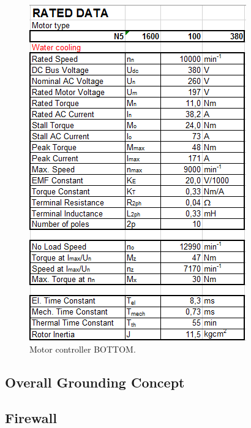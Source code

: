 \begin{figure}[H]
	\centering
	\includegraphics[width=.3\textwidth]{./img/app-mr.png}
	\caption{Motor controller BOTTOM.}
	\label{app:mr}
\end{figure}

\subsection{Overall Grounding Concept}

\subsection{Firewall}
